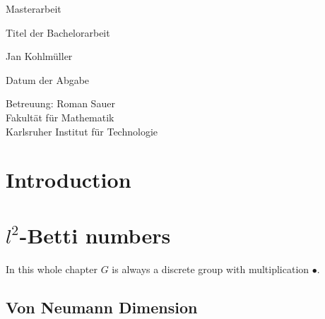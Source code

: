 \documentclass[12pt,a4paper]{scrartcl}
\numberwithin{equation}{section}
\newcommand{\2}{\mathbb{Z} / 2 \mathbb{Z}}
\begin{document}
  \pagestyle{empty}

  \begin{titlepage}

    \vspace*{2cm} 

 \begin{center} \large 
    
    Masterarbeit
    \vspace*{2cm}

    {\huge Titel der Bachelorarbeit}
    \vspace*{2.5cm}

    Jan Kohlmüller
    \vspace*{1.5cm}

    Datum der Abgabe
    \vspace*{4.5cm}


    Betreuung: Roman Sauer \\[1cm]
    Fakultät für Mathematik \\[1cm]
		Karlsruher Institut für Technologie
  \end{center}
\end{titlepage}



  \tableofcontents

\newpage
 


  \pagestyle{headings}

\section{Introduction}


\section{$l^2$-Betti numbers}
In this whole chapter $G$ is always a discrete group with multiplication $\bullet$.
\subsection{Von Neumann Dimension}
\end{document}
